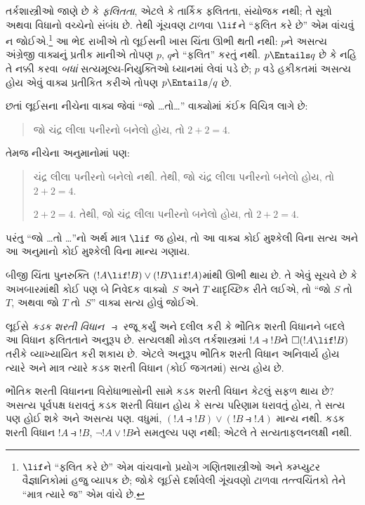 તર્કશાસ્ત્રીઓ જાણે છે કે \emph{ફલિતતા}, એટલે કે તાર્કિક ફલિતતા,
સંયોજક નથી; તે સૂત્રો અથવા વિધાનો વચ્ચેનો સંબંધ છે. તેથી
ગૂંચવણ ટાળવા $\lif$ને ``ફલિત કરે છે'' એમ વાંચવું ન જોઈએ.\footnote{$\lif$ને
  ``ફલિત કરે છે'' એમ વાંચવાનો પ્રયોગ ગણિતશાસ્ત્રીઓ અને કમ્પ્યુટર
  વૈજ્ઞાનિકોમાં હજુ વ્યાપક છે; જોકે લૂઈસે દર્શાવેલી ગૂંચવણો ટાળવા
  તત્ત્વચિંતકો તેને ``માત્ર ત્યારે જ'' એમ વાંચે છે.} આ ભેદ રાખીએ
તો લૂઈસની ખાસ ચિંતા ઊભી થતી નથી: $p$ને અસત્ય અંગ્રેજી વાક્યનું
પ્રતીક માનીએ તોપણ $p$, $q$ને ``ફલિત'' કરતું નથી. $p \Entails q$
છે કે નહિ તે નક્કી કરવા \emph{બધાં} સત્યમૂલ્ય-નિયુક્તિઓ ધ્યાનમાં લેવાં પડે
છે; $p$ વડે હકીકતમાં અસત્ય હોય એવું વાક્ય પ્રતીકિત કરીએ તોપણ
$p \Entails/ q$ છે.

છતાં લૂઈસના નીચેના વાક્ય જેવાં ``જો \dots તો\dots'' વાક્યોમાં
કંઈક વિચિત્ર લાગે છે:
\begin{quote}
જો ચંદ્ર લીલા પનીરનો બનેલો હોય, તો $2+2=4$.
\end{quote}
તેમજ નીચેના અનુમાનોમાં પણ:
\begin{quote}
  ચંદ્ર લીલા પનીરનો બનેલો નથી. તેથી, જો ચંદ્ર લીલા પનીરનો બનેલો
  હોય, તો $2+2=4$.

  $2+2 = 4$. તેથી, જો ચંદ્ર લીલા
  પનીરનો બનેલો હોય, તો $2+2=4$.
\end{quote}
પરંતુ ``જો \dots તો \dots''નો અર્થ માત્ર $\lif$ જ હોય, તો આ વાક્ય
કોઈ મુશ્કેલી વિના સત્ય અને આ અનુમાનો કોઈ મુશ્કેલી વિના માન્ય ગણાય.

બીજી ચિંતા પુનરુક્તિ $(!A \lif !B) \lor (!B \lif
!A)$માંથી ઊભી થાય છે. તે એવું સૂચવે છે કે અખબારમાંથી કોઈ પણ બે
નિવેદક વાક્યો~$S$ અને $T$ યાદૃચ્છિક રીતે લઈએ, તો ``જો $S$ તો
$T$, અથવા જો $T$ તો~$S$'' વાક્ય સત્ય હોવું જોઈએ.
\endgroup


\begingroup
\makeatletter{}\makeatother


\label{guunit:OLP-0520}


લૂઈસે \emph{કડક શરતી વિધાન}~$\strictif$ રજૂ કર્યું અને દલીલ કરી કે
ભૌતિક શરતી વિધાનને બદલે આ વિધાન ફલિતતાને અનુરૂપ છે. સત્યલક્ષી મોડલ
તર્કશાસ્ત્રમાં $!A \strictif !B$ને $\Box(!A \lif
!B)$ તરીકે વ્યાખ્યાયિત કરી શકાય છે. એટલે અનુરૂપ ભૌતિક શરતી
વિધાન અનિવાર્ય હોય ત્યારે અને માત્ર ત્યારે કડક શરતી વિધાન (કોઈ
જગતમાં) સત્ય હોય છે.

ભૌતિક શરતી વિધાનના વિરોધાભાસોની સામે કડક શરતી વિધાન કેટલું સફળ થાય
છે? અસત્ય પૂર્વપક્ષ ધરાવતું કડક શરતી વિધાન હોય કે સત્ય પરિણામ
ધરાવતું હોય, તે સત્ય પણ હોઈ શકે અને અસત્ય પણ. વધુમાં,
$(!A \strictif !B) \lor (!B \strictif !A)$ માન્ય નથી. કડક શરતી
વિધાન $!A \strictif !B$, $\lnot !A \lor !B$ને સમતુલ્ય પણ નથી;
એટલે તે સત્યતાફલનલક્ષી નથી.

